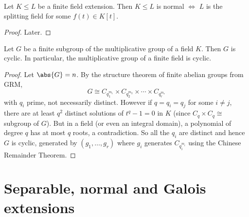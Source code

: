 \documentclass{article}
\begin{document}
\begin{nthm}\label{thm:1.26}
    Let $K \leq L$ be a finite field extension. Then $K \leq L$ is normal $\iff$ $L$ is the splitting field for some $f(t) \in K[t]$.
\end{nthm}
\begin{proof}
    Later.
\end{proof}

\begin{nthm}\label{thm:1.28}
    Let $G$ be a finite subgroup of the multiplicative group of a field $K$. Then $G$ is cyclic. In particular, the multiplicative group of a finite field is cyclic.
\end{nthm}
\begin{proof}
    Let $\abs{G} = n$. By the structure theorem of finite abelian groups from GRM,
    \begin{equation*}
        G \cong C_{q_1^{m_1}} \times C_{q_2^{m_2}} \times \dotsm \times C_{q_r^{m_r}}
    \end{equation*}
    with $q_i$ prime, not necessarily distinct.
    However if $q = q_i = q_j$ for some $i \neq j$, there are at least $q^2$ distinct solutions of $t^q - 1 = 0$ in $K$ (since $C_q \times C_q \cong$ subgroup of $G$).
    But in a field (or even an integral domain), a polynomial of degree $q$ has at most $q$ roots, a contradiction.
    So all the $q_i$ are distinct and hence $G$ is cyclic, generated by $(g_1, \dotsc, g_r)$ where $g_i$ generates $C_{q_i^{m_i}}$ using the Chinese Remainder Theorem.
\end{proof}
\clearpage
\section{Separable, normal and Galois extensions}

\end{document}
